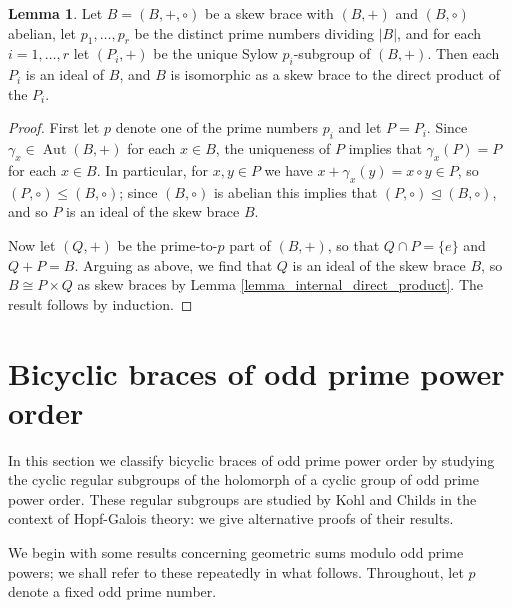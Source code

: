 \documentclass[reqno]{amsart}
\theoremstyle{definition}
\newtheorem{lemma}[theorem]{Lemma}
\DeclareMathOperator{\Aut}{\mbox{Aut}}
\begin{document}
\begin{lemma} \label{lemma_decomposition}
Let $ B = (B,+,\circ) $ be a skew brace with $ (B,+) $ and $ (B,\circ) $ abelian, let $ p_{1}, \ldots , p_{r} $ be the distinct prime numbers dividing $ |B| $, and for each $ i=1, \ldots ,r $ let $ (P_{i},+) $ be the unique Sylow $ p_{i} $-subgroup of $ (B,+) $. Then each $ P_{i} $ is an ideal of $ B $, and $ B $ is isomorphic as a skew brace to the direct product of the $ P_{i} $.
\end{lemma}
\begin{proof}
First let $ p $ denote one of the prime numbers $ p_{i} $ and let $ P=P_{i} $. Since $ \gamma_{x} \in \Aut(B,+) $ for each $ x \in B $, the uniqueness of $ P $ implies that $ \gamma_{x}(P)=P $ for each $ x \in B $. In particular, for $ x,y \in P $ we have $ x+\gamma_{x}(y) = x \circ y \in P $, so $ (P,\circ) \leq (B,\circ) $; since $ (B,\circ) $ is abelian this implies that $ (P,\circ) \trianglelefteq  (B,\circ) $, and so $ P $ is an ideal of the skew brace $ B $. 

Now let $ (Q,+) $ be the prime-to-$ p $ part of $ (B,+) $, so that $ Q \cap P = \{ e \} $ and $ Q + P = B $. Arguing as above, we find that $ Q $ is an ideal of the skew brace $ B $, so $ B \cong P \times Q $ as skew braces by Lemma \ref{lemma_internal_direct_product}. The result follows by induction.
\end{proof}


\section{Bicyclic braces of odd prime power order} \label{sec_p_power}

In this section we classify bicyclic braces of odd prime power order by studying the cyclic regular subgroups of the holomorph of a cyclic group of odd prime power order. These regular subgroups are studied by Kohl \cite{Ko98} and Childs \cite{TWE} in the context of Hopf-Galois theory: we give alternative proofs of their results. 

We begin with some results concerning geometric sums modulo odd prime powers; we shall refer to these repeatedly in what follows. Throughout, let $ p $ denote a fixed odd prime number.
\end{document}
